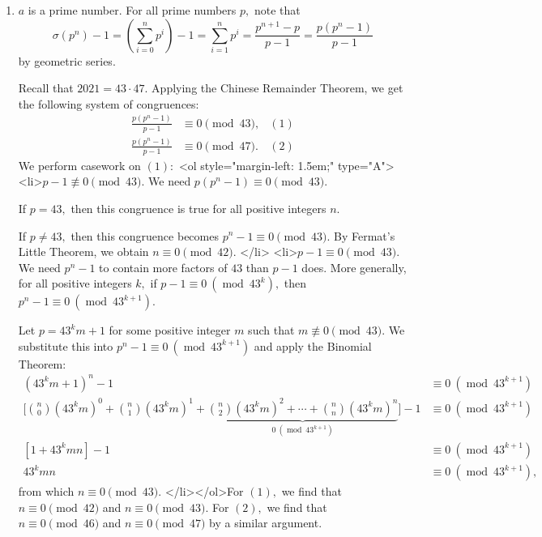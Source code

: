 \begin{enumerate}
\begin{enumerate}
        \item $a$ is a prime number. For all prime numbers $p,$ note that
 \[\sigma\left(p^n\right)-1=\left(\sum_{i=0}^{n}p^i\right)-1=\sum_{i=1}^{n}p^i=\frac{p^{n+1}-p}{p-1}=\frac{p\left(p^n-1\right)}{p-1}\]by geometric series. 

 Recall that $2021=43\cdot47.$ Applying the Chinese Remainder Theorem, we get the following system of congruences:
 \begin{align*} \frac{p\left(p^n-1\right)}{p-1}&\equiv0\pmod{43}, &(1)\\ \frac{p\left(p^n-1\right)}{p-1}&\equiv0\pmod{47}. &(2) \end{align*}
We perform casework on $(1):$
<ol style="margin-left: 1.5em;" type="A"> <li>$p-1\not\equiv0\pmod{43}.$ We need $p\left(p^n-1\right)\equiv0\pmod{43}.$ 

 If $p=43,$ then this congruence is true for all positive integers $n.$ 

 If $p\neq43,$ then this congruence becomes $p^n-1\equiv0\pmod{43}.$ By Fermat's Little Theorem, we obtain $n\equiv0\pmod{42}.$
</li> <li>$p-1\equiv0\pmod{43}.$ We need $p^n-1$ to contain more factors of $43$ than $p-1$ does. More generally, for all positive integers $k,$ if $p-1\equiv0 \ \left(\operatorname{mod} \ 43^k\right),$ then $p^n-1\equiv0 \ \left(\operatorname{mod} \ 43^{k+1}\right).$ 

 Let $p=43^km+1$ for some positive integer $m$ such that $m\not\equiv0\pmod{43}.$ We substitute this into $p^n-1\equiv0 \ \left(\operatorname{mod} \ 43^{k+1}\right)$ and apply the Binomial Theorem:
 \begin{align*} \left(43^km+1\right)^n-1&\equiv0 \ \left(\operatorname{mod} \ 43^{k+1}\right) \\ \Biggl[\binom{n}{0}\left(43^km\right)^0+\binom{n}{1}\left(43^km\right)^1+\phantom{ }\underbrace{\binom{n}{2}\left(43^km\right)^2+\cdots+\binom{n}{n}\left(43^km\right)^n}_{0 \ \left(\operatorname{mod} \ 43^{k+1}\right)}\phantom{ }\Biggr]-1 &\equiv0 \ \left(\operatorname{mod} \ 43^{k+1}\right) \\ \left[1+43^kmn\right]-1&\equiv0 \ \left(\operatorname{mod} \ 43^{k+1}\right) \\ 43^kmn&\equiv0 \ \left(\operatorname{mod} \ 43^{k+1}\right), \end{align*}
from which $n\equiv0\pmod{43}.$
</li></ol>For $(1),$ we find that $n\equiv0\pmod{42}$ and $n\equiv0\pmod{43}.$ For $(2),$ we find that $n\equiv0\pmod{46}$ and $n\equiv0\pmod{47}$ by a similar argument. 


\end{enumerate}
\end{enumerate}
